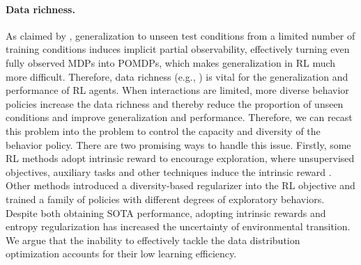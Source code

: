 \documentclass[nohyperref]{article}
\theoremstyle{plain}
\begin{document}
\paragraph{Data richness.} As claimed by \citep{ghosh2021generalization},  generalization to unseen test conditions from a limited number of training conditions induces implicit partial observability, effectively turning even fully observed MDPs into POMDPs, which makes generalization in RL much more difficult. Therefore, data richness (e.g., ) is vital for the generalization and performance of RL agents.  When interactions are limited, more diverse behavior policies increase the data richness and thereby reduce the proportion of unseen conditions  and  improve generalization and performance.  Therefore, we can recast this problem into the problem to control the  capacity and diversity  of the behavior policy. There are two promising ways to handle this issue. 
Firstly, some RL methods adopt intrinsic reward to encourage exploration, where unsupervised objectives, auxiliary tasks and other techniques induce the intrinsic reward \citep{icm}.
Other methods \citep{agent57} introduced a diversity-based regularizer into the RL objective and trained a family of policies with different degrees of exploratory behaviors.   Despite both obtaining SOTA performance, adopting intrinsic rewards and entropy regularization has increased the uncertainty of environmental transition. We argue that the inability to effectively tackle the  data distribution optimization accounts for their low learning efficiency. 
 
\end{document}
